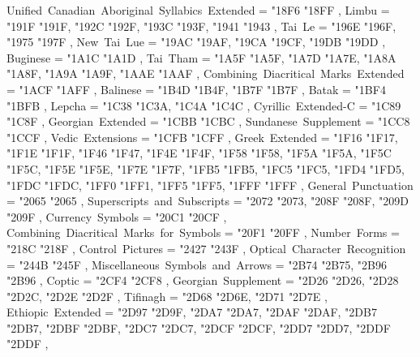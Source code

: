 {    Unified~Canadian~Aboriginal~Syllabics~Extended = { {"18F6} {"18FF} },
    Limbu                                          = { {"191F} {"191F}, {"192C} {"192F}, {"193C} {"193F}, {"1941} {"1943} },
    Tai~Le                                         = { {"196E} {"196F}, {"1975} {"197F} },
    New~Tai~Lue                                    = { {"19AC} {"19AF}, {"19CA} {"19CF}, {"19DB} {"19DD} },
    Buginese                                       = { {"1A1C} {"1A1D} },
    Tai~Tham                                       = { {"1A5F} {"1A5F}, {"1A7D} {"1A7E}, {"1A8A} {"1A8F}, {"1A9A} {"1A9F}, {"1AAE} {"1AAF} },
    Combining~Diacritical~Marks~Extended           = { {"1ACF} {"1AFF} },
    Balinese                                       = { {"1B4D} {"1B4F}, {"1B7F} {"1B7F} },
    Batak                                          = { {"1BF4} {"1BFB} },
    Lepcha                                         = { {"1C38} {"1C3A}, {"1C4A} {"1C4C} },
    Cyrillic~Extended-C                            = { {"1C89} {"1C8F} },
    Georgian~Extended                              = { {"1CBB} {"1CBC} },
    Sundanese~Supplement                           = { {"1CC8} {"1CCF} },
    Vedic~Extensions                               = { {"1CFB} {"1CFF} },
    Greek~Extended                                 = { {"1F16} {"1F17}, {"1F1E} {"1F1F}, {"1F46} {"1F47}, {"1F4E} {"1F4F}, {"1F58} {"1F58}, {"1F5A} {"1F5A}, {"1F5C} {"1F5C}, {"1F5E} {"1F5E}, {"1F7E} {"1F7F}, {"1FB5} {"1FB5}, {"1FC5} {"1FC5}, {"1FD4} {"1FD5}, {"1FDC} {"1FDC}, {"1FF0} {"1FF1}, {"1FF5} {"1FF5}, {"1FFF} {"1FFF} },
    General~Punctuation                            = { {"2065} {"2065} },
    Superscripts~and~Subscripts                    = { {"2072} {"2073}, {"208F} {"208F}, {"209D} {"209F} },
    Currency~Symbols                               = { {"20C1} {"20CF} },
    Combining~Diacritical~Marks~for~Symbols        = { {"20F1} {"20FF} },
    Number~Forms                                   = { {"218C} {"218F} },
    Control~Pictures                               = { {"2427} {"243F} },
    Optical~Character~Recognition                  = { {"244B} {"245F} },
    Miscellaneous~Symbols~and~Arrows               = { {"2B74} {"2B75}, {"2B96} {"2B96} },
    Coptic                                         = { {"2CF4} {"2CF8} },
    Georgian~Supplement                            = { {"2D26} {"2D26}, {"2D28} {"2D2C}, {"2D2E} {"2D2F} },
    Tifinagh                                       = { {"2D68} {"2D6E}, {"2D71} {"2D7E} },
    Ethiopic~Extended                              = { {"2D97} {"2D9F}, {"2DA7} {"2DA7}, {"2DAF} {"2DAF}, {"2DB7} {"2DB7}, {"2DBF} {"2DBF}, {"2DC7} {"2DC7}, {"2DCF} {"2DCF}, {"2DD7} {"2DD7}, {"2DDF} {"2DDF} },
}
